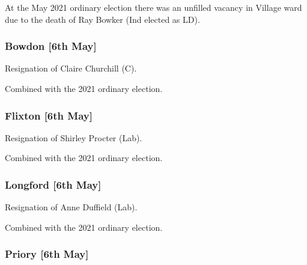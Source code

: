 \documentclass[a4paper,openany]{book}
\begin{document}
\begin{resultsiii}
At the May 2021 ordinary election there was an unfilled vacancy in Village ward due to the death of Ray Bowker (Ind elected as LD).

\subsubsection*{Bowdon \hspace*{\fill}\nolinebreak[1]%
	\enspace\hspace*{\fill}
	[6th May]}


Resignation of Claire Churchill (C).

Combined with the 2021 ordinary election.

\subsubsection*{Flixton \hspace*{\fill}\nolinebreak[1]%
	\enspace\hspace*{\fill}
	[6th May]}


Resignation of Shirley Procter (Lab).

Combined with the 2021 ordinary election.

\subsubsection*{Longford \hspace*{\fill}\nolinebreak[1]%
	\enspace\hspace*{\fill}
	[6th May]}


Resignation of Anne Duffield (Lab).

Combined with the 2021 ordinary election.

\subsubsection*{Priory \hspace*{\fill}\nolinebreak[1]%
	\enspace\hspace*{\fill}
	[6th May]}



\end{resultsiii}
\end{document}
